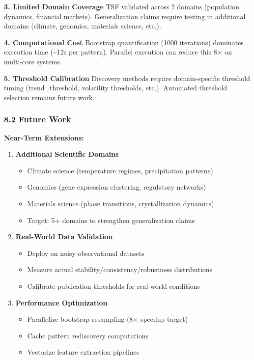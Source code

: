 \documentclass[
]{article}
\providecommand{\tightlist}{%
  \setlength{\itemsep}{0pt}\setlength{\parskip}{0pt}}
\begin{document}
\textbf{3. Limited Domain Coverage} TSF validated across 2 domains
(population dynamics, financial markets). Generalization claims require
testing in additional domains (climate, genomics, materials science,
etc.).

\textbf{4. Computational Cost} Bootstrap quantification (1000
iterations) dominates execution time (\textasciitilde12s per pattern).
Parallel execution can reduce this 8× on multi-core systems.

\textbf{5. Threshold Calibration} Discovery methods require
domain-specific threshold tuning (trend\_threshold, volatility
thresholds, etc.). Automated threshold selection remains future work.

\subsubsection{8.2 Future Work}\label{future-work}

\textbf{Near-Term Extensions:}

\begin{enumerate}
\def\labelenumi{\arabic{enumi}.}
\tightlist
\item
  \textbf{Additional Scientific Domains}

  \begin{itemize}
  \tightlist
  \item
    Climate science (temperature regimes, precipitation patterns)
  \item
    Genomics (gene expression clustering, regulatory networks)
  \item
    Materials science (phase transitions, crystallization dynamics)
  \item
    Target: 5+ domains to strengthen generalization claims
  \end{itemize}
\item
  \textbf{Real-World Data Validation}

  \begin{itemize}
  \tightlist
  \item
    Deploy on noisy observational datasets
  \item
    Measure actual stability/consistency/robustness distributions
  \item
    Calibrate publication thresholds for real-world conditions
  \end{itemize}
\item
  \textbf{Performance Optimization}

  \begin{itemize}
  \tightlist
  \item
    Parallelize bootstrap resampling (8× speedup target)
  \item
    Cache pattern rediscovery computations
  \item
    Vectorize feature extraction pipelines
  \end{itemize}
\end{enumerate}
\end{document}
